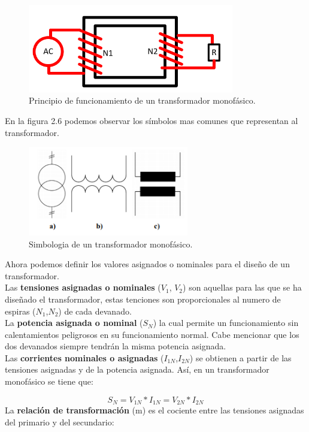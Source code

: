 \begin{figure}[H]
\centering
\includegraphics[width=9cm]{capitulo3/figs/trans.png}
\caption{ Principio de funcionamiento de un transformador monofásico. \cite{transformador}}
\end{figure}

En la figura 2.6 podemos observar los símbolos mas comunes que representan al transformador. 

\begin{figure}[H]
\centering
\includegraphics[width=7cm]{capitulo3/figs/simbolos.png}
\caption{ Simbologia de un transformador monofásico.}
\end{figure}

Ahora podemos definir los valores asignados o nominales para el diseño de un transformador.\\

Las \textbf{tensiones asignadas o nominales} ($V_{1}$, $V_{2}$) son aquellas para las que se ha diseñado el transformador, estas tenciones son proporcionales al numero de espiras ($N_{1}$,$N_{2}$) de cada devanado.\\

La \textbf{potencia asignada o nominal} ($S_{N}$) la cual permite un funcionamiento sin calentamientos peligrosos en su funcionamiento normal. Cabe mencionar que los dos devanados siempre tendrán la misma potencia asignada.\\

Las \textbf{corrientes nominales o asignadas} ($I_{1N}$,$I_{2N}$) se obtienen a partir de las tensiones asignadas y de la potencia asignada. Así, en un transformador monofásico se tiene que:

\begin{equation}\label{eq:ej}
S_{N}=V_{1N}*I_{1N}=V_{2N}*I_{2N}
\end{equation}
La \textbf{relación de transformación} (m) es el cociente entre las tensiones asignadas del primario y del secundario: 

